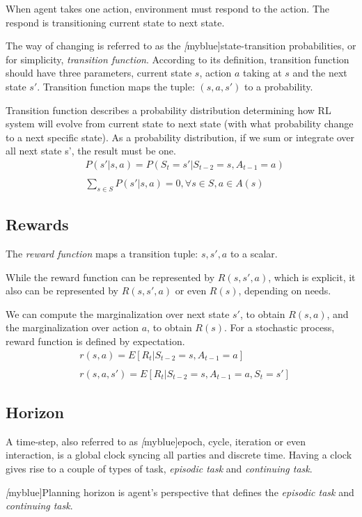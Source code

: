 When agent takes one action, environment must respond to the action. The respond is transitioning current state to next
state. \par The way of changing is referred to as the \emph[myblue]{state-transition probabilities}, or for simplicity,
\emph{transition function}. According to its definition, transition function should have three parameters, current state
$s$, action $a$ taking at $s$ and the next state $s'$. Transition function maps the tuple: $(s, a, s')$ to a
probability. \par Transition function describes a probability distribution determining how RL system will evolve from
current state to next state (with what probability change to a next specific state). As a probability distribution, if
we sum or integrate over all next state s', the result must be one.
\begin{align*}
  & P(s'|s,a) = P(S_{t}=s'|S_{t-2}=s, A_{t-1}=a) \\
  \\
  & \sum\limits_{s\in S} P(s'|s,a) = 0, \forall s\in S, a\in A(s)
\end{align*}

\subsection{Rewards}

The \emph{reward function} maps a transition tuple: $s, s', a$ to a scalar.\par While the reward function can be
represented by $R(s, s', a)$, which is explicit, it also can be represented by $R(s, s', a)$ or even $R(s)$, depending
on needs. \par We can compute the marginalization over next state $s'$, to obtain $R(s, a)$, and the marginalization
over action $a$, to obtain $R(s)$. For a stochastic process, reward function is defined by expectation.
\begin{align*}
  & r(s,a)=E[R_t|S_{t-2}=s, A_{t-1}=a] \\
  \\
  & r(s,a,s')=E[R_t|S_{t-2}=s, A_{t-1}=a, S_t=s']
\end{align*}

\subsection{Horizon}

A time-step, also referred to as \emph[myblue]{epoch, cycle, iteration or even interaction,} is a global clock syncing
all parties and discrete time. Having a clock gives rise to a couple of types of task, {\itshape episodic task} and
{\itshape continuing task}. \par \emph[myblue]{Planning horizon} is agent's perspective that defines the {\itshape
  episodic task} and {\itshape continuing task}.

